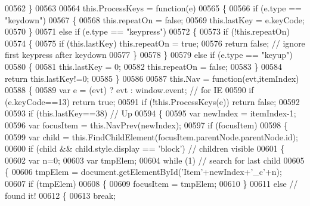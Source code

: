 \begin{DoxyCode}
00562     \}
00563 
00564     this.ProcessKeys = \textcolor{keyword}{function}(e)
00565     \{
00566       \textcolor{keywordflow}{if} (e.type == \textcolor{stringliteral}{"keydown"})
00567       \{
00568         this.repeatOn = \textcolor{keyword}{false};
00569         this.lastKey = e.keyCode;
00570       \}
00571       \textcolor{keywordflow}{else} \textcolor{keywordflow}{if} (e.type == \textcolor{stringliteral}{"keypress"})
00572       \{
00573         \textcolor{keywordflow}{if} (!this.repeatOn)
00574         \{
00575           \textcolor{keywordflow}{if} (this.lastKey) this.repeatOn = \textcolor{keyword}{true};
00576           \textcolor{keywordflow}{return} \textcolor{keyword}{false}; \textcolor{comment}{// ignore first keypress after keydown}
00577         \}
00578       \}
00579       \textcolor{keywordflow}{else} \textcolor{keywordflow}{if} (e.type == \textcolor{stringliteral}{"keyup"})
00580       \{
00581         this.lastKey = 0;
00582         this.repeatOn = \textcolor{keyword}{false};
00583       \}
00584       \textcolor{keywordflow}{return} this.lastKey!=0;
00585     \}
00586 
00587     this.Nav = \textcolor{keyword}{function}(evt,itemIndex)
00588     \{
00589       var e  = (evt) ? evt : window.event; \textcolor{comment}{// for IE}
00590       if (e.keyCode==13) \textcolor{keywordflow}{return} \textcolor{keyword}{true};
00591       \textcolor{keywordflow}{if} (!this.ProcessKeys(e)) \textcolor{keywordflow}{return} \textcolor{keyword}{false};
00592 
00593       \textcolor{keywordflow}{if} (this.lastKey==38) \textcolor{comment}{// Up}
00594       \{
00595         var newIndex = itemIndex-1;
00596         var focusItem = this.NavPrev(newIndex);
00597         \textcolor{keywordflow}{if} (focusItem)
00598         \{
00599           var child = this.FindChildElement(focusItem.parentNode.parentNode.id);
00600           \textcolor{keywordflow}{if} (child && child.style.display == \textcolor{stringliteral}{'block'}) \textcolor{comment}{// children visible}
00601           \{
00602             var n=0;
00603             var tmpElem;
00604             \textcolor{keywordflow}{while} (1) \textcolor{comment}{// search for last child}
00605             \{
00606               tmpElem = document.getElementById(\textcolor{stringliteral}{'Item'}+newIndex+\textcolor{stringliteral}{'\_c'}+n);
00607               \textcolor{keywordflow}{if} (tmpElem)
00608               \{
00609                 focusItem = tmpElem;
00610               \}
00611               \textcolor{keywordflow}{else} \textcolor{comment}{// found it!}
00612               \{
00613                 \textcolor{keywordflow}{break};

\end{DoxyCode}
